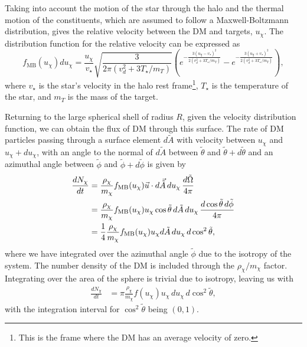 Taking into account the motion of the star through the halo and the thermal motion of the constituents, which are assumed to follow a Maxwell-Boltzmann distribution, gives the relative velocity between the DM and targets, $ u_\chi$. 
The distribution function for the relative velocity can be expressed as~\cite{Busoni:2017mhe_oct_Evaporationscatteringmomentum}
\begin{equation}
    f_{\mathrm{MB}}(u_\chi)du_\chi = \frac{u_\chi}{v_\star} \sqrt{\frac{3 }{2 \pi (v_d^2 + 3 T_\star /m_T)}} \left( e^{-\frac{3(u_\chi - v_\star)^2}{2(v_d^2 + 3 T_\star /m_T)}} - e^{-\frac{3(u_\chi + v_\star)^2}{2(v_d^2 + 3 T_\star /m_T)}} \right),
\end{equation}
where $v_\star$ is the star's velocity in the halo rest frame\footnote{This is the frame where the DM has an average velocity of zero.}, $T_\star$ is the temperature of the star, and $m_T$ is the mass of the target.

Returning to the large spherical shell of radius $R$, given the velocity distribution function, we can obtain the flux of DM through this surface. The rate of DM particles passing through a surface element $d\tilde{A}$ with velocity between $u_\chi$ and $u_\chi + du_\chi$, with an angle to the normal of $d\tilde{A}$ between $\tilde\theta$ and $\tilde \theta + d\tilde \theta$ and an azimuthal angle between $\tilde \phi$ and $\tilde \phi + d\tilde \phi$ is given by~\cite{Press:1985ug_Capturesungalactic}
\begin{align}
    \frac{dN_\chi}{dt} &= \frac{\rho_\chi}{m_\chi}f_{\mathrm{MB}}(u_\chi) \vec{u}\cdot d\vec{\tilde{A}}\, d u_\chi\, \frac{d\tilde \Omega}{4\pi}\\
    & = \frac{\rho_\chi}{m_\chi}f_{\rm MB}(u_\chi)u_\chi \cos\tilde\theta \,d\tilde{A}\, d u_\chi\,  \frac{d\cos\tilde\theta \,d\tilde\phi}{4\pi}\\
    & = \frac{1}{4}\frac{\rho_\chi}{m_\chi}f_{\rm MB}(u_\chi)u_\chi d\tilde{A}\, d u_\chi\,d\cos^2\tilde\theta,
\end{align}
where we have integrated over the azimuthal angle $\tilde \phi$ due to the isotropy of the system. The number density of the DM is included through the $\rho_\chi/m_\chi$ factor. 
Integrating over the area of the sphere is trivial due to isotropy, leaving us with 
\begin{align}
    \frac{dN_\chi}{dt} &= \pi \frac{\rho_\chi}{m_\chi} f(u_\chi)u_\chi\, d u_\chi \, d\cos^2\tilde\theta,
\end{align}
with the integration interval for $\cos^2\tilde\theta$ being $(0, 1)$.

